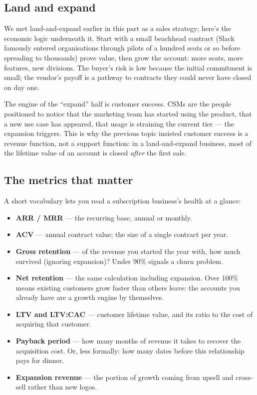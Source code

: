 \subsection{Land and expand}


We met land-and-expand earlier in this part as a sales strategy; here's the economic logic underneath it. Start with a small beachhead contract (Slack famously entered organisations through pilots of a hundred seats or so before spreading to thousands) prove value, then grow the account: more seats, more features, new divisions. The buyer's risk is low because the initial commitment is small; the vendor's payoff is a pathway to contracts they could never have closed on day one.


The engine of the ``expand'' half is customer success. CSMs are the people positioned to notice that the marketing team has started using the product, that a new use case has appeared, that usage is straining the current tier — the expansion triggers. This is why the previous topic insisted customer success is a revenue function, not a support function: in a land-and-expand business, most of the lifetime value of an account is closed \emph{after} the first sale.



\subsection{The metrics that matter}


A short vocabulary lets you read a subscription business's health at a glance:


\begin{itemize}[leftmargin=*]
\item \textbf{ARR / MRR} — the recurring base, annual or monthly.
\item \textbf{ACV} — annual contract value; the size of a single contract per year.
\item \textbf{Gross retention} — of the revenue you started the year with, how much survived (ignoring expansion)? Under 90\% signals a churn problem.
\item \textbf{Net retention} — the same calculation including expansion. Over 100\% means existing customers grow faster than others leave: the accounts you already have are a growth engine by themselves.
\item \textbf{LTV and LTV:CAC} — customer lifetime value, and its ratio to the cost of acquiring that customer.
\item \textbf{Payback period} — how many months of revenue it takes to recover the acquisition cost. Or, less formally: how many dates before this relationship pays for dinner.
\item \textbf{Expansion revenue} — the portion of growth coming from upsell and cross-sell rather than new logos.
\end{itemize}

